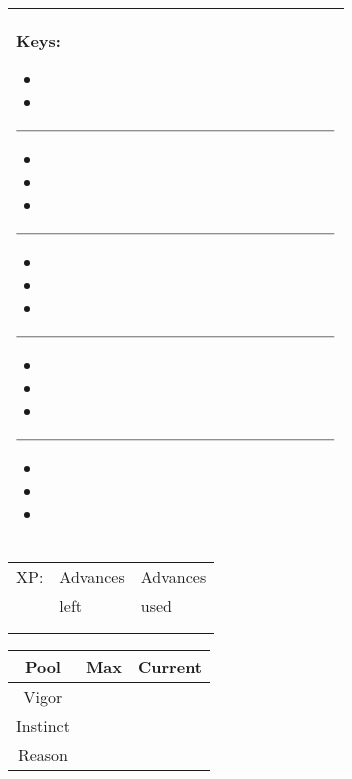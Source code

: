 \documentclass[a4paper, 12pt, finnish]{report}
\begin{document}
\begin{tabularx}{\columnwidth}{|X|} \hline
    Keys: 
        {\scriptsize
\begin{itemize}
    \item[] 
    \item[] 
\end{itemize}
$\rule{8cm}{0.15mm}$
\begin{itemize}
    \item[] 
    \item[] 
    \item[] 
\end{itemize}
$\rule{8cm}{0.15mm}$
\begin{itemize}
    \item[] 
    \item[] 
    \item[] 
\end{itemize}
$\rule{8cm}{0.15mm}$
\begin{itemize}
    \item[] 
    \item[] 
    \item[] 
\end{itemize}
$\rule{8cm}{0.15mm}$
\begin{itemize}
    \item[] 
    \item[] 
    \item[] 
\end{itemize}
} 
\\
\hline
\end{tabularx}

\begin{tabular}{|p{1.55cm}|p{3cm}|p{3cm}|} \hline
    XP: & Advances & Advances\\ & left & used\\  &  & \\   &  & \\\hline 
\end{tabular}

\begin{tabular}{|p{1.55cm}|p{3cm}|p{3cm}|} \hline
    \multicolumn{1}{|c|}{Pool} & \multicolumn{1}{c|}{Max} & \multicolumn{1}{c|}{Current} \\ \hline
    \multicolumn{1}{|c|}{Vigor} & & \\[20pt] \hline
    \multicolumn{1}{|c|}{Instinct} & & \\[20pt] \hline
    \multicolumn{1}{|c|}{Reason} & & \\[20pt] \hline
\end{tabular}
\end{document}
